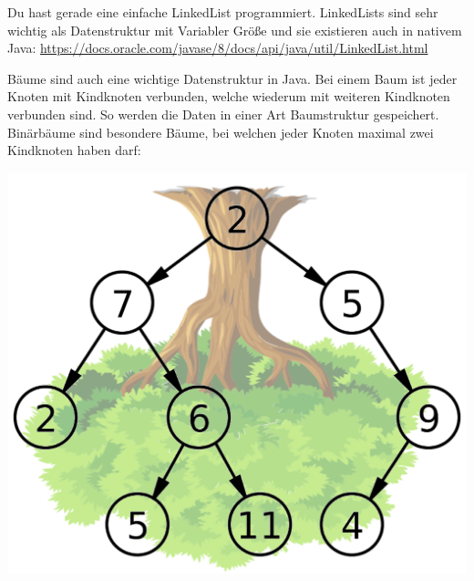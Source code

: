 \documentclass{../../sheet}
\begin{document}
Du hast gerade eine einfache LinkedList programmiert. LinkedLists sind sehr wichtig als Datenstruktur mit Variabler Größe und sie existieren auch in nativem Java: \url{https://docs.oracle.com/javase/8/docs/api/java/util/LinkedList.html}

\newpage
{}
Bäume sind auch eine wichtige Datenstruktur in Java. Bei einem Baum ist jeder Knoten mit Kindknoten verbunden, welche wiederum mit weiteren Kindknoten verbunden sind. So werden die Daten in einer Art Baumstruktur gespeichert. Binärbäume sind besondere Bäume, bei welchen jeder Knoten maximal zwei Kindknoten haben darf: 
\\
\begin{center}
    \includegraphics[width=0.5\linewidth]{img/baum.png}
\end{center}
\end{document}
